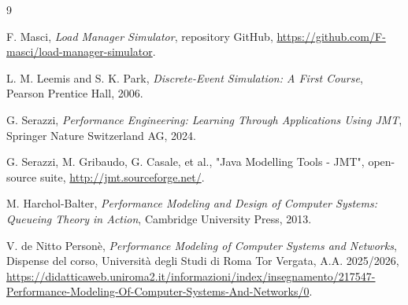 ﻿\documentclass[a4paper,12pt]{article}
\begin{document}
\begin{thebibliography}{9}

F. Masci,
\textit{Load Manager Simulator},
repository GitHub,
\url{https://github.com/F-masci/load-manager-simulator}.

L. M. Leemis and S. K. Park, 
\textit{Discrete-Event Simulation: A First Course}, 
Pearson Prentice Hall, 2006.

G. Serazzi, 
\textit{Performance Engineering: Learning Through Applications Using JMT}, 
Springer Nature Switzerland AG, 2024.

G. Serazzi, M. Gribaudo, G. Casale, et al., 
"Java Modelling Tools - JMT", open-source suite, 
\url{http://jmt.sourceforge.net/}.

M. Harchol-Balter, 
\textit{Performance Modeling and Design of Computer Systems: Queueing Theory in Action}, 
Cambridge University Press, 2013.

V. de Nitto Personè,
\textit{Performance Modeling of Computer Systems and Networks},
Dispense del corso, Università degli Studi di Roma Tor Vergata, 
A.A. 2025/2026, \url{https://didatticaweb.uniroma2.it/informazioni/index/insegnamento/217547-Performance-Modeling-Of-Computer-Systems-And-Networks/0}.

\end{thebibliography}
\end{document}
